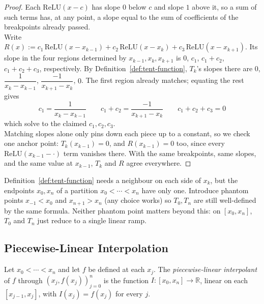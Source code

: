 		\begin{proof}
			Each $\mathrm{ReLU}(x-c)$ has slope $0$ below $c$ and slope $1$ above it, so a sum of such terms has, at any point, a slope equal to the sum of coefficients of the breakpoints already passed. \\
			
			Write $R(x) := c_1\,\mathrm{ReLU}(x-x_{k-1}) + c_2\,\mathrm{ReLU}(x-x_k) + c_3\,\mathrm{ReLU}(x-x_{k+1})$. Its slope in the four regions determined by $x_{k-1},x_k,x_{k+1}$ is $0$, $c_1$, $c_1+c_2$, $c_1+c_2+c_3$, respectively. By Definition~\ref{def:tent-function}, $T_k$'s slopes there are $0$, $\dfrac{1}{x_k-x_{k-1}}$, $\dfrac{-1}{x_{k+1}-x_k}$, $0$. The first region already matches; equating the rest gives
			\[
				c_1 = \frac{1}{x_k-x_{k-1}} \qquad c_1+c_2 = \frac{-1}{x_{k+1}-x_k} \qquad c_1+c_2+c_3=0
			\]
			which solve to the claimed $c_1,c_2,c_3$. \\
			
			Matching slopes alone only pins down each piece up to a constant, so we check one anchor point: $T_k(x_{k-1})=0$, and $R(x_{k-1})=0$ too, since every $\mathrm{ReLU}(x_{k-1}-\cdot)$ term vanishes there. With the same breakpoints, same slopes, and the same value at $x_{k-1}$, $T_k$ and $R$ agree everywhere.
		\end{proof}
		
		\begin{remark}
			\label{rem:boundary-tents}
			Definition~\ref{def:tent-function} needs a neighbour on each side of $x_k$, but the endpoints $x_0,x_n$ of a partition $x_0<\cdots<x_n$ have only one. Introduce phantom points $x_{-1}<x_0$ and $x_{n+1}>x_n$ (any choice works) so $T_0,T_n$ are still well-defined by the same formula. Neither phantom point matters beyond this: on $[x_0,x_n]$, $T_0$ and $T_n$ just reduce to a single linear ramp.
		\end{remark}
		
	\subsection{Piecewise-Linear Interpolation}
		
		\begin{definition}
			\label{def:piecewise-linear-interpolant}
			Let $x_0<\cdots<x_n$ and let $f$ be defined at each $x_j$. The \emph{piecewise-linear interpolant} of $f$ through $(x_j,f(x_j))_{j=0}^n$ is the function $I:[x_0,x_n]\to\mathbb{R}$, linear on each $[x_{j-1},x_j]$, with $I(x_j)=f(x_j)$ for every $j$.
		\end{definition}
		
